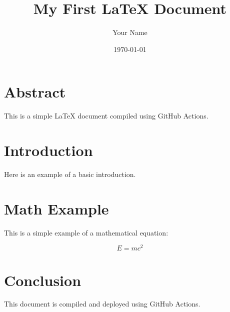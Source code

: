 \documentclass[a4paper,12pt]{article}
\title{My First LaTeX Document}
\author{Your Name}
\date{\today}
\begin{document}
\maketitle

\section*{Abstract}
This is a simple LaTeX document compiled using GitHub Actions.

\section{Introduction}
Here is an example of a basic introduction. \lipsum[1] %

\section{Math Example}
This is a simple example of a mathematical equation:

\begin{equation}
E = mc^2
\end{equation}

\section{Conclusion}
This document is compiled and deployed using GitHub Actions. \lipsum[2]
\end{document}
